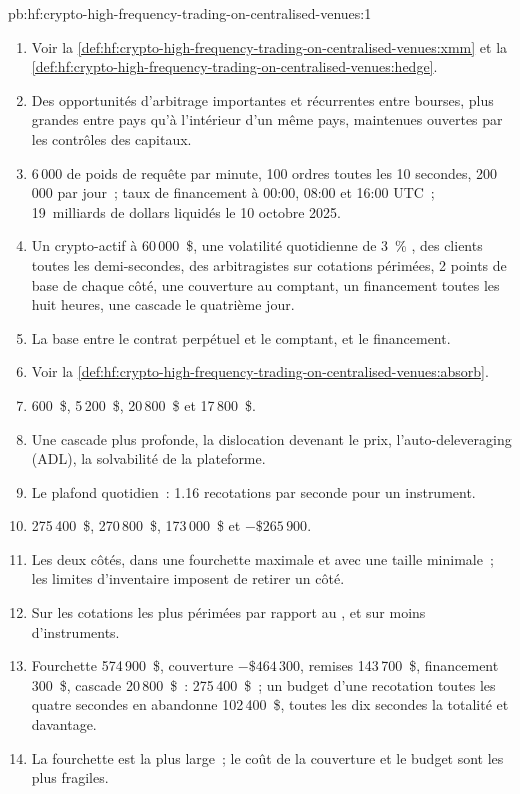 \begin{solution}{pb:hf:crypto-high-frequency-trading-on-centralised-venues:1}
\begin{enumerate}
\item Voir la \cref{def:hf:crypto-high-frequency-trading-on-centralised-venues:xmm} et la \cref{def:hf:crypto-high-frequency-trading-on-centralised-venues:hedge}.
\item Des opportunités d'arbitrage importantes et récurrentes entre bourses, plus grandes entre pays qu'à l'intérieur d'un même pays, maintenues ouvertes par les contrôles des capitaux.
\item 6\,000 de poids de requête par minute, 100 ordres toutes les 10 secondes, 200\,000 par jour~; taux de financement à 00:00, 08:00 et 16:00 UTC~; 19~milliards de dollars liquidés le 10 octobre
2025.
\item Un crypto-actif à 60\,000~\$, une volatilité quotidienne de 3~\% , des clients toutes les demi-secondes, des arbitragistes sur cotations périmées, 2 points de base de chaque côté, une couverture au comptant,
un financement toutes les huit heures, une cascade le quatrième jour.
\item La base entre le contrat perpétuel et le comptant, et le financement.
\item Voir la \cref{def:hf:crypto-high-frequency-trading-on-centralised-venues:absorb}.
\item 600~\$, 5\,200~\$, 20\,800~\$ et 17\,800~\$.
\item Une cascade plus profonde, la dislocation devenant le prix, l'auto-deleveraging (ADL), la solvabilité de la plateforme.
\item Le plafond quotidien~: 1.16 recotations par seconde pour un instrument.
\item 275\,400~\$, 270\,800~\$, 173\,000~\$ et $-\$265\,900$.
\item Les deux côtés, dans une fourchette maximale et avec une taille minimale~; les limites d'inventaire imposent de retirer un côté.
\item Sur les cotations les plus périmées par rapport au , et sur moins d'instruments.
\item Fourchette 574\,900~\$, couverture $-\$464\,300$, remises 143\,700~\$, financement 300~\$, cascade 20\,800~\$~: 275\,400~\$~; un budget d'une recotation toutes les quatre
secondes en abandonne 102\,400~\$, toutes les dix secondes la totalité et davantage.
\item La fourchette est la plus large~; le coût de la couverture et le budget sont les plus fragiles.

\end{enumerate}
\end{solution}
